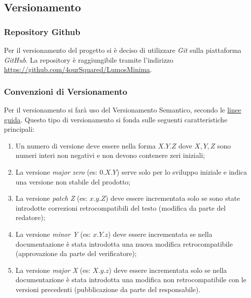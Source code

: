 \documentclass[a4paper, 12pt]{article}
\begin{document}
\subsection{Versionamento}
\subsubsection{Repository Github}
Per il versionamento del progetto si è deciso di utilizzare \textit{Git} sulla piattaforma \textit{GitHub}. La repository è raggiungibile tramite l'indirizzo \href{https://github.com/4ourSquared/LumosMinima}{https://github.com/4ourSquared/LumosMinima}.
\subsubsection{Convenzioni di Versionamento}
Per il versionamento si farà uso del Versionamento Semantico, secondo le \href{https://semver.org/lang/it/#specifica-di-versionamento-semantico-semver}{linee guida}.\newline
Questo tipo di versionamento si fonda sulle seguenti caratteristiche principali:
\begin{enumerate}
    \item Un numero di versione deve essere nella forma $X.Y.Z$ dove $X,Y,Z$ sono numeri interi non negativi e non devono contenere zeri iniziali;
    \item La versione \textit{major zero} (es: $0.X.Y$) serve solo per lo sviluppo iniziale e indica una versione non stabile del prodotto;
    \item La versione \textit{patch Z} (es: $x.y.Z$) deve essere incrementata solo se sono state introdotte correzioni retrocompatibili del testo (modifica da parte del redatore);
    \item La versione \textit{minor Y} (es: $x.Y.z$) deve essere incrementata se nella documentazione è stata introdotta una nuova modifica retrocompatibile (approvazione da parte del verificatore);
    \item La versione \textit{major X} (es: $X.y.z$) deve essere incrementata solo se nella documentazione è stata introdotta una modifica non retrocompatibile con le versioni precedenti (pubblicazione da parte del responsabile).
\end{enumerate}
\end{document}
